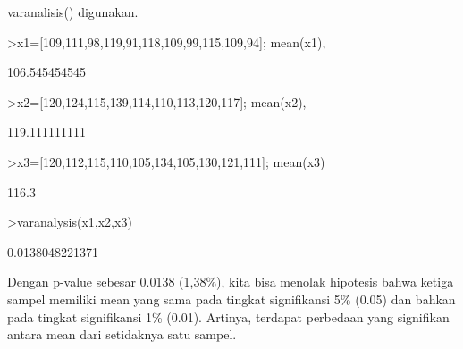 \documentclass{article}
\begin{document}
\begin{eulernotebook}
\begin{eulercomment}
\begin{eulercomment}
\begin{eulercomment}
\begin{eulercomment}
\begin{eulercomment}
varanalisis() digunakan.
\end{eulercomment}
\begin{eulerprompt}
>x1=[109,111,98,119,91,118,109,99,115,109,94]; mean(x1),
\end{eulerprompt}
\begin{euleroutput}
  106.545454545
\end{euleroutput}
\begin{eulerprompt}
>x2=[120,124,115,139,114,110,113,120,117]; mean(x2),
\end{eulerprompt}
\begin{euleroutput}
  119.111111111
\end{euleroutput}
\begin{eulerprompt}
>x3=[120,112,115,110,105,134,105,130,121,111]; mean(x3)
\end{eulerprompt}
\begin{euleroutput}
  116.3
\end{euleroutput}
\begin{eulerprompt}
>varanalysis(x1,x2,x3)
\end{eulerprompt}
\begin{euleroutput}
  0.0138048221371
\end{euleroutput}
\begin{eulercomment}
Dengan p-value sebesar 0.0138 (1,38\%), kita bisa menolak hipotesis
bahwa ketiga sampel memiliki mean yang sama pada tingkat signifikansi
5\% (0.05) dan bahkan pada tingkat signifikansi 1\% (0.01). Artinya,
terdapat perbedaan yang signifikan antara mean dari setidaknya satu
sampel.


\end{eulercomment}
\end{eulercomment}
\end{eulercomment}
\end{eulercomment}
\end{eulercomment}
\end{eulernotebook}
\end{document}
